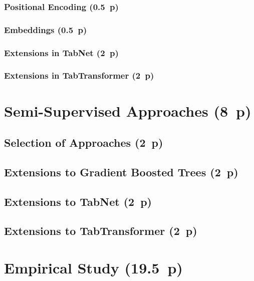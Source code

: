 \subsubsection{Positional Encoding (0.5~p)}\label{positional-encoding}

\subsubsection{Embeddings (0.5~p)}\label{embeddings}

\subsubsection{Extensions in TabNet (2~p)}\label{extensions-in-tabnet}

\subsubsection{Extensions in
  TabTransformer (2~p)}\label{extensions-in-tabtransformer}

\newpage
\section{Semi-Supervised Approaches (8~p)}\label{semi-supervised-approaches}

\subsection{Selection of Approaches (2~p)}\label{selection-of-approaches-1}

\subsection{Extensions to Gradient Boosted
  Trees (2~p)}\label{extensions-to-gradient-boosted-trees}

\subsection{Extensions to TabNet (2~p)}\label{extensions-to-tabnet}

\subsection{Extensions to
  TabTransformer (2~p)}\label{extensions-to-tabtransformer}

\newpage
\section{Empirical Study (19.5~p)}\label{empirical-study}

